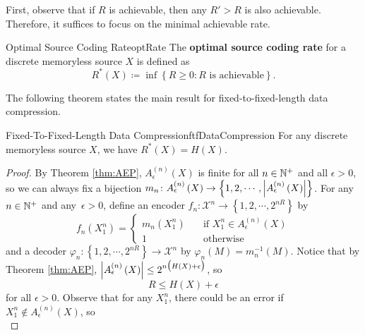 \documentclass[math, code]{amznotes}
\theoremstyle{remark}
\begin{document}
First, observe that if $R$ is achievable, then any $R' > R$ is also achievable. Therefore, it suffices to focus on the minimal achievable rate.
\begin{dfnbox}{Optimal Source Coding Rate}{optRate}
    The {\color{red} \textbf{optimal source coding rate}} for a discrete memoryless source $X$ is defined as 
    \begin{equation*}
        R^*\left(X\right) \coloneqq \inf \left\{R \geq 0 \colon R \textrm{ is achievable}\right\}.
    \end{equation*}
\end{dfnbox}
The following theorem states the main result for fixed-to-fixed-length data compression.
\begin{thmbox}{Fixed-To-Fixed-Length Data Compression}{ftfDataCompression}
    For any discrete memoryless source $X$, we have $R^*\left(X\right) = H\left(X\right)$.
    \tcblower
    \begin{proof}
        By Theorem \ref{thm:AEP}, $A_{\epsilon}^{\left(n\right)}\left(X\right)$ is finite for all $n \in \mathbb{N}^+$ and all $\epsilon > 0$, so we can always fix a bijection $m_n \colon A_{\epsilon}^{\left(n\right)}\left(X\right) \to \left\{1, 2, \cdots, {\left\lvert {A_{\epsilon}^{\left(n\right)}\left(X\right)} \right\rvert}\right\}$. For any $n \in \mathbb{N}^+$ and any~$\epsilon > 0$, define an encoder $f_n \colon \mathcal{X}^n \to \left\{1, 2, \cdots, 2^{nR}\right\}$ by 
        \begin{equation*}
            f_n\left(X_1^n\right) = \begin{cases}
                m_n\left(X_1^n\right) & \quad\textrm{if } X_1^n \in A_{\epsilon}^{\left(n\right)}\left(X\right) \\
                1 & \quad\textrm{otherwise}
            \end{cases}
        \end{equation*}
        and a decoder $\varphi_n \colon \left\{1, 2, \cdots, 2^{nR}\right\} \to \mathcal{X}^n$ by $\varphi_n\left(M\right) = m_n^{-1}\left(M\right)$. Notice that by Theorem \ref{thm:AEP}, ${\left\lvert {A_{\epsilon}^{\left(n\right)}\left(X\right)} \right\rvert} \leq 2^{n\bigl(H\left(X\right) + \epsilon\bigr)}$, so
        \begin{equation*}
            R \leq H\left(X\right) + \epsilon
        \end{equation*}
        for all $\epsilon > 0$. Observe that for any $X_1^n$, there could be an error if $X_1^n \notin A_{\epsilon}^{\left(n\right)}\left(X\right)$, so 
        \begin{equation*}

\end{equation*}
\end{proof}
\end{thmbox}
\end{document}
